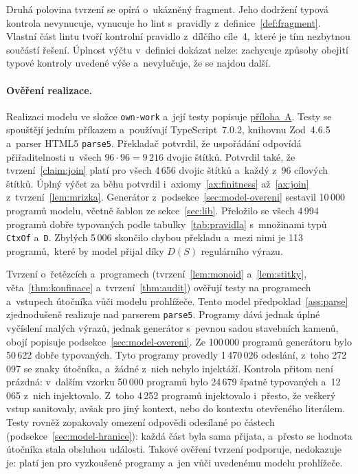Druhá polovina tvrzení se opírá o~ukázněný fragment. Jeho dodržení typová kontrola nevynucuje, vynucuje ho lint s~pravidly z~definice~\ref{def:fragment}. Vlastní část lintu tvoří kontrolní pravidlo z~dílčího cíle~4,~které je tím nezbytnou součástí řešení. Úplnost výčtu v~definici dokázat nelze: zachycuje způsoby obejití typové kontroly uvedené výše a~nevylučuje, že se najdou další.

\paragraph{Ověření realizace.}
Realizaci modelu ve složce \texttt{own-work} a~její testy popisuje \hyperref[app:own-work]{příloha~A}. Testy se spouštějí jedním příkazem a~používají TypeScript~7.0.2, knihovnu Zod~4.6.5 a~parser HTML5 \texttt{parse5}. Překladač potvrdil, že uspořádání odpovídá přiřaditelnosti u~všech $96 \cdot 96 = 9\,216$ dvojic štítků. Potvrdil také, že tvrzení~\ref{claim:join} platí pro všech 4\,656 dvojic štítků a~každý z~96 cílových štítků. Úplný výčet za běhu potvrdil i~axiomy~\ref{ax:finitness} až~\ref{ax:join} z~tvrzení~\ref{lem:mrizka}. Generátor z~podsekce~\ref{sec:model-overeni} sestavil 10\,000 programů modelu, včetně šablon ze sekce~\ref{sec:lib}. Přeložilo se všech 4\,994 programů dobře typovaných podle tabulky~\ref{tab:pravidla} s~množinami typů \texttt{CtxOf} a~\texttt{D}. Zbylých 5\,006 skončilo chybou překladu a~mezi nimi je 113 programů,~které by model přijal díky $D(S)$ regulárního výrazu.

Tvrzení o~řetězcích a~programech (tvrzení~\ref{lem:monoid} a~\ref{lem:stitky}, věta~\ref{thm:konfinace} a~tvrzení~\ref{thm:audit}) ověřují testy na programech a~vstupech útočníka vůči modelu prohlížeče. Tento model předpoklad~\ref{ass:parse} zjednodušeně realizuje nad parserem \texttt{parse5}. Programy dává jednak úplné vyčíslení malých výrazů, jednak generátor s~pevnou sadou stavebních kamenů, obojí popisuje podsekce~\ref{sec:model-overeni}. Ze 100\,000 programů generátoru bylo 50\,622 dobře typovaných. Tyto programy provedly 1\,470\,026 odeslání, z~toho 272\,097 se znaky útočníka, a~žádné z~nich nebylo injektáží. Kontrola přitom není prázdná: v~dalším vzorku 50\,000 programů bylo 24\,679 špatně typovaných a~12\,065 z~nich injektovalo. Z~toho 4\,252 programů injektovalo i~přesto, že veškerý vstup sanitovaly, avšak pro jiný kontext, nebo do kontextu otevřeného literálem. Testy rovněž zopakovaly omezení odpovědi odesílané po částech (podsekce~\ref{sec:model-hranice}): každá část byla sama přijata, a~přesto se hodnota útočníka stala obsluhou události. Takové ověření tvrzení podporuje, nedokazuje je: platí jen pro vyzkoušené programy a~jen vůči uvedenému modelu prohlížeče.

